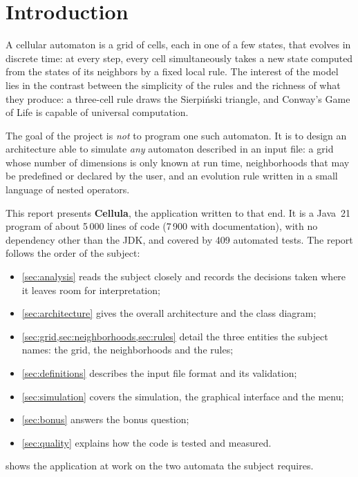\section{Introduction}

A cellular automaton is a grid of cells, each in one of a few states, that evolves in discrete
time: at every step, every cell simultaneously takes a new state computed from the states of its
neighbors by a fixed local rule. The interest of the model lies in the contrast between the
simplicity of the rules and the richness of what they produce: a three-cell rule draws the
Sierpi\'nski triangle, and Conway's Game of Life is capable of universal computation.

The goal of the project is \emph{not} to program one such automaton. It is to design an
architecture able to simulate \emph{any} automaton described in an input file: a grid whose
number of dimensions is only known at run time, neighborhoods that may be predefined or declared
by the user, and an evolution rule written in a small language of nested operators.

This report presents \textbf{Cellula}, the application written to that end. It is a Java~21
program of about 5\,000 lines of code (7\,900 with documentation), with no dependency other than
the JDK, and covered by 409 automated tests. The report follows the order of the subject:

\begin{itemize}
    \item \cref{sec:analysis} reads the subject closely and records the decisions taken where it
          leaves room for interpretation;
    \item \cref{sec:architecture} gives the overall architecture and the class diagram;
    \item \cref{sec:grid,sec:neighborhoods,sec:rules} detail the three entities the subject
          names: the grid, the neighborhoods and the rules;
    \item \cref{sec:definitions} describes the input file format and its validation;
    \item \cref{sec:simulation} covers the simulation, the graphical interface and the menu;
    \item \cref{sec:bonus} answers the bonus question;
    \item \cref{sec:quality} explains how the code is tested and measured.
\end{itemize}

 shows the application at work on the two automata the subject requires.

